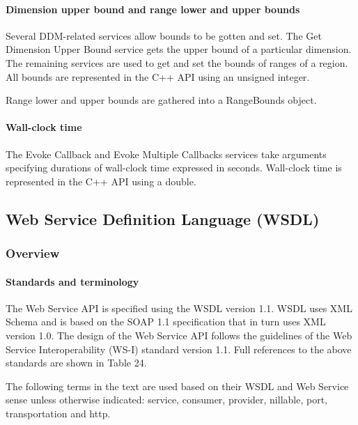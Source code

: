 \clearpage

\begin{compactstdpage}
    \paragraph{Dimension upper bound and range lower and upper bounds}

    Several DDM-related services allow bounds to be gotten and set. The Get Dimension Upper Bound service gets the upper bound of a particular dimension. The remaining services are used to get and set the bounds of ranges of a region. All bounds are represented in the C++ API using an unsigned integer.

    Range lower and upper bounds are gathered into a RangeBounds object.

    \paragraph{Wall-clock time}

    The Evoke Callback and Evoke Multiple Callbacks services take arguments specifying durations of wall-clock time expressed in seconds. Wall-clock time is represented in the C++ API using a double.

    \subsection{Web Service Definition Language (WSDL)}

    \subsubsection{Overview}

    \paragraph{Standards and terminology}

    The Web Service API is specified using the WSDL version 1.1. WSDL uses XML Schema and is based on the SOAP 1.1 specification that in turn uses XML version 1.0. The design of the Web Service API follows the guidelines of the Web Service Interoperability (WS-I) standard version 1.1. Full references to the above standards are shown in Table 24.

    \cxiitabletwentyfour

    The following terms in the text are used based on their WSDL and Web Service sense unless otherwise indicated: service, consumer, provider, nillable, port, transportation and http.


\end{compactstdpage}
